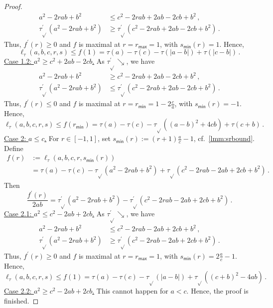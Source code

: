 \documentclass{article}
\newcommand{\abs}[1]{\left| #1 \right|} %
\newcommand*{\ms}[1]{\mathsf{#1}}
\newcommand{\pr}{^\prime}
\newcommand{\equationFullstop}{\, .}
\newcommand{\eqfs}{\equationFullstop}
\newcommand{\equationComma}{\, ,}
\newcommand{\eqcm}{\equationComma}
\newcommand{\tran}{\tau}
\newcommand{\trans}{\tran_{\!\sqrt{}}}
\newcommand{\dtrans}{\trans\pr}
\newcommand{\lhs}{\ell_{\tran}}
\newcommand{\decr}{\searrow}
\begin{document}
\begin{appendix}
\begin{proof}
	\begin{align*}
		a^2-2rab+b^2 &\leq c^2-2rab+2ab-2cb+b^2\eqcm\\
		\dtrans(a^2-2rab+b^2) &\geq \dtrans(c^2-2rab+2ab-2cb+b^2)
		\eqfs
	\end{align*}
	Thus, $f\pr(r)\geq0$ and $f$ is maximal at $r = r_{\ms{max}} = 1$, with $s_{\ms{min}}(r) = 1$. Hence,
	\begin{equation*}
		\lhs(a,b,c,r,s) \leq f(1) = \tran(a)-\tran(c)-\tran(|a-b|)+\tran(|c-b|)
		\eqfs
	\end{equation*}
	\underline{Case 1.2: $a^2 \geq c^2+2ab-2cb$.} As $\dtrans\decr$, we have
	\begin{align*}
		a^2-2rab+b^2 &\geq c^2-2rab+2ab-2cb+b^2\eqcm\\
		\dtrans(a^2-2rab+b^2) &\leq \dtrans(c^2-2rab+2ab-2cb+b^2) \eqfs
	\end{align*}
	Thus, $f\pr(r)\leq0$ and $f$ is maximal at $r = r_{\ms{min}} = 1-2\frac ca$, with $s_{\ms{min}}(r) = -1$. Hence,
	\begin{equation*}
		\lhs(a,b,c,r,s) \leq  f(r_{\ms{min}}) = \tran(a)-\tran(c)-\trans((a-b)^2+4cb)+\tran(c+b)
		\eqfs
	\end{equation*}
	\underline{Case 2: $a\leq c$.}  For $r\in[-1,1]$, set $s_{\ms{min}}(r) := (r+1) \frac ac-1$, cf.\ \cref{lmm:srbound}. Define
	\begin{align*}
		f(r) &:= \lhs(a,b,c,r,s_{\ms{min}}(r)) 
		\\&= \tran(a)-\tran(c)-\trans(a^2-2rab+b^2)+\trans(c^2-2rab-2ab+2cb+b^2)
		\eqfs
	\end{align*}
	Then 
	\begin{equation*}
		\frac{f\pr(r)}{2ab} = 
		\dtrans(a^2-2rab+b^2) - \dtrans(c^2-2rab-2ab+2cb+b^2)
		\eqfs
	\end{equation*}
	\underline{Case 2.1: $a^2 \leq c^2-2ab+2cb$.} As $\dtrans\decr$, we have
	\begin{align*}
		a^2-2rab+b^2 &\leq c^2-2rab-2ab+2cb+b^2\eqcm\\
		\dtrans(a^2-2rab+b^2) &\geq \dtrans(c^2-2rab-2ab+2cb+b^2)\eqfs
	\end{align*}
	Thus, $f\pr(r)\geq0$ and $f$ is maximal at $r = r_{\ms{max}} = 1$, with $s_{\ms{min}}(r) = 2\frac ac-1$. Hence,
	\begin{equation*}
		\lhs(a,b,c,r,s) \leq f(1) = \tran(a)-\tran(c)-\trans(\abs{a-b})+\trans((c+b)^2-4ab)
		\eqfs
	\end{equation*}
	\underline{Case 2.2: $a^2 \geq c^2-2ab+2cb$.} This cannot happen for $a < c$. Hence, the proof is finished.

\end{proof}
\end{appendix}
\end{document}
